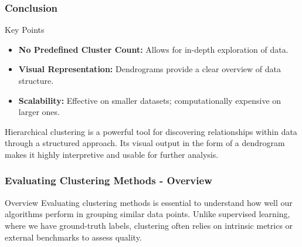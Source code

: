 \documentclass[aspectratio=169]{beamer}
\begin{document}
\begin{frame}
  \frametitle{Conclusion}
  \begin{block}{Key Points}
    \begin{itemize}
      \item \textbf{No Predefined Cluster Count:} Allows for in-depth exploration of data.
      \item \textbf{Visual Representation:} Dendrograms provide a clear overview of data structure.
      \item \textbf{Scalability:} Effective on smaller datasets; computationally expensive on larger ones.
    \end{itemize}
  \end{block}

  Hierarchical clustering is a powerful tool for discovering relationships within data through a structured approach. Its visual output in the form of a dendrogram makes it highly interpretive and usable for further analysis.
\end{frame}

\begin{frame}[fragile]
    \frametitle{Evaluating Clustering Methods - Overview}
    \begin{block}{Overview}
        Evaluating clustering methods is essential to understand how well our algorithms perform in grouping similar data points. Unlike supervised learning, where we have ground-truth labels, clustering often relies on intrinsic metrics or external benchmarks to assess quality.
    \end{block}
\end{frame}
\end{document}
